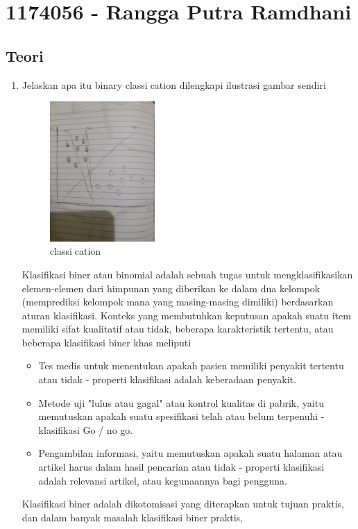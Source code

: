 \section{1174056 - Rangga Putra Ramdhani}
\subsection{Teori}
\begin{enumerate}
	\item Jelaskan apa itu binary classication dilengkapi ilustrasi gambar sendiri
	\hfill\break
	\begin{figure}[H]
		\includegraphics[width=4cm]{figures/1174056/2/1.jpg}
		\centering
		\caption{classication}
	\end{figure}
	Klasifikasi biner atau binomial adalah sebuah tugas untuk mengklasifikasikan elemen-elemen dari himpunan yang diberikan ke dalam dua kelompok (memprediksi kelompok mana yang masing-masing dimiliki) berdasarkan aturan klasifikasi. 
	Konteks yang membutuhkan keputusan apakah suatu item memiliki sifat kualitatif atau tidak, beberapa karakteristik tertentu, atau beberapa klasifikasi biner khas meliputi
	\begin{itemize}
		\item Tes medis untuk menentukan apakah pasien memiliki penyakit tertentu atau tidak - properti klasifikasi adalah keberadaan penyakit.
		\item Metode uji "lulus atau gagal" atau kontrol kualitas di pabrik, yaitu memutuskan apakah suatu spesifikasi telah atau belum terpenuhi - klasifikasi Go / no go.
		\item Pengambilan informasi, yaitu memutuskan apakah suatu halaman atau artikel harus dalam hasil pencarian atau tidak - properti klasifikasi adalah relevansi artikel, atau kegunaannya bagi pengguna.
	\end{itemize}
	\hfill\break
	Klasifikasi biner adalah dikotomisasi yang diterapkan untuk tujuan praktis, dan dalam banyak masalah klasifikasi biner praktis, 

\end{enumerate}
